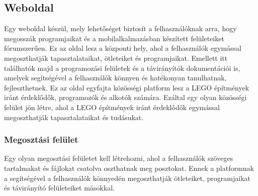 \documentclass{article}
\begin{document}
\subsection{Weboldal}

Egy weboldal készül, mely lehetőséget biztosít a felhasználóknak arra, hogy megosszák programjaikat és a mobilalkalmazásban készített felületeiket fórumszerűen. Ez az oldal lesz a központi hely, ahol a felhasználók egymással megoszthatják tapasztalataikat, ötleteiket és programjaikat. Emellett itt találhatók majd a programozási felületek és a távirányítók dokumentációi is, amelyek segítségével a felhasználók könnyen és hatékonyan tanulhatnak, fejleszthetnek. Ez az oldal egyfajta közösségi platform lesz a LEGO építmények iránt érdeklődők, programozók és alkotók számára. Ezáltal egy olyan közösségi felület jön létre, ahol a LEGO építmények iránt érdeklődők egymással megoszthatják tapasztalataikat és tudásukat.


\subsubsection{Megosztási felület}

Egy olyan megosztási felületet kell létrehozni, ahol a felhasználók szöveges tartalmakat és fájlokat csatolva oszthatnak meg posztokat. Ennek a platformnak a segítségével a felhasználók könnyedén megoszthatják ötleteiket, programjaikat és távirányító felületeiket másokkal.
\end{document}
